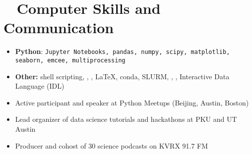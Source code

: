 \documentclass[10pt,letterpaper]{article}
\begin{document}
\section*{\faTerminal ~ Computer Skills and Communication}

\begin{itemize}
    \item \textbf{Python}: \texttt{Jupyter Notebooks, pandas, numpy, scipy, matplotlib, seaborn, emcee, multiprocessing}
    \item \textbf{Other:} shell scripting, \faGit, \faGithub, \LaTeX, conda, SLURM,  \faApple, \faLinux, Interactive Data Language (IDL)
    \item Active participant and speaker at Python Meetups (Beijing, Austin, Boston)
    \item Lead organizer of data science tutorials and hackathons at PKU and UT Austin
    \item Producer and cohost of 30 science podcasts on KVRX 91.7 FM
\end{itemize}
\end{document}
